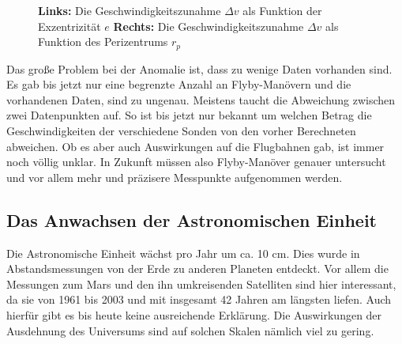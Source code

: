 \begin{figure}[htb]
\begin{center}
\noindent    
{}
\end{center}
\vskip -10pt
  \caption{{\bf Links:} Die Geschwindigkeitszunahme $\Delta v$ als Funktion der Exzentrizität $e$
{\bf Rechts:} Die Geschwindigkeitszunahme $\Delta v$ als Funktion des Perizentrums $r_p$\cite{Turyshev2004}}
\label{fig:dia}
\end{figure} 


Das gro{\ss}e Problem bei der Anomalie ist, dass zu wenige Daten
vorhanden sind. Es gab bis jetzt nur eine begrenzte Anzahl an
Flyby-Man\"overn und die vorhandenen Daten, sind zu ungenau. 
Meistens taucht die Abweichung zwischen zwei Datenpunkten auf. So ist bis
jetzt nur bekannt um welchen Betrag die Geschwindigkeiten der
verschiedene Sonden von den vorher Berechneten abweichen. Ob es aber
auch Auswirkungen auf die Flugbahnen gab, ist immer noch v\"ollig
unklar. In Zukunft m\"ussen also Flyby-Man\"over genauer untersucht und
vor allem mehr und pr\"azisere Messpunkte aufgenommen werden.

\subsection{Das Anwachsen der Astronomischen Einheit}


Die Astronomische Einheit w\"achst pro Jahr um ca. 10 cm. Dies wurde in
Abstandsmessungen von der Erde zu anderen Planeten entdeckt. Vor allem
die Messungen zum Mars und den ihn umkreisenden Satelliten sind hier
interessant, da sie von 1961 bis 2003 und mit insgesamt 42 Jahren am
l\"angsten liefen. Auch hierf\"ur gibt es bis heute keine ausreichende
Erkl\"arung. Die Auswirkungen der Ausdehnung des Universums sind auf
solchen Skalen n\"amlich viel zu gering.

